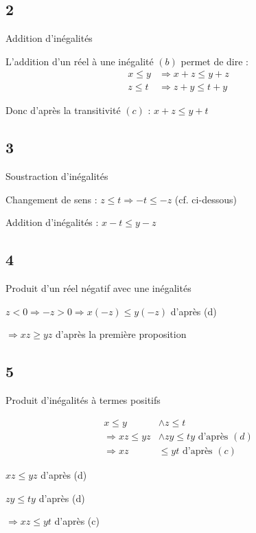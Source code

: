 \documentclass[12pt]{smfbook}
\begin{document}
\subsection*{2} Addition d'inégalités

L'addition d'un réel à une inégalité $(b)$ permet de dire :
\begin{displaymath}
	\begin{split}
x \leq y & \Rightarrow x  + z\leq y + z \\
z \leq t & \Rightarrow z + y \leq t + y
	\end{split}
\end{displaymath}

Donc d'après la transitivité $(c)$  : $ x  + z \leq y + t$ 

\subsection*{3} Soustraction d'inégalités
 
Changement de sens : $z \leq t \Rightarrow -t \leq -z$ (cf. ci-dessous)

Addition d'inégalités : $x - t \leq y - z$ 

\subsection*{4} Produit d'un réel négatif avec une inégalités

$ z < 0 \Rightarrow -z > 0 \Rightarrow x(-z) \leq y(-z)$ d'après (d)

$ \Rightarrow xz \geq yz$ d'après la première proposition

\subsection*{5} Produit d'inégalités à termes positifs

\begin{displaymath}
	\begin{split}
	x \leq y  &\wedge z\leq t\\
	\Rightarrow xz \leq yz &\wedge zy \leq ty \text{ d'après $(d)$} \\
	\Rightarrow xz &\leq yt \text{ d'après $(c)$}
	\end{split}
\end{displaymath}

$xz \leq yz$ d'après (d)

$zy \leq ty$ d'après (d)

$\Rightarrow xz \leq yt$ d'après (c)
\end{document}
